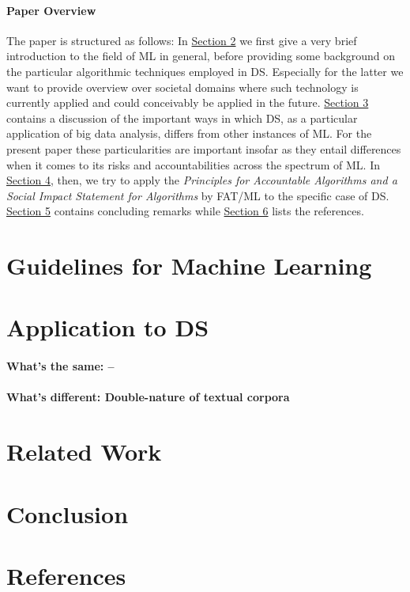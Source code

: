 \documentclass{article}
\begin{document}
\paragraph{Paper Overview}
The paper is structured as follows: In \hyperlink{sec2}{Section 2} we first give a very brief introduction to the field of ML in general, before providing some background on the particular algorithmic techniques employed in DS. Especially for the latter we want to provide overview over societal domains where such technology is currently applied and could conceivably be applied in the future. \hyperlink{sec3}{Section 3} contains a discussion of the important ways in which DS, as a particular application of big data analysis, differs from other instances of ML. For the present paper these particularities are important insofar as they entail differences when it comes to its risks and accountabilities across the spectrum of ML. In \hyperlink{sec4}{Section 4}, then, we try to apply the \emph{Principles for Accountable Algorithms and a Social Impact Statement for Algorithms} by FAT/ML to the specific case of DS. \hyperlink{sec5}{Section 5} contains concluding remarks while \hyperlink{sec6}{Section 6} lists the references.

\section{Guidelines for Machine Learning}%

\section{Application to DS}%
\paragraph{What's the same: --}
\paragraph{What's different: Double-nature of textual corpora}
\section{Related Work}%
\section{Conclusion}

\section{References}%
\end{document}

